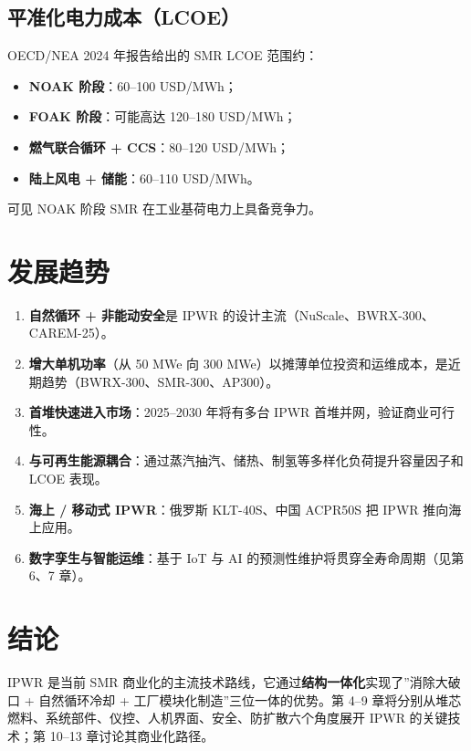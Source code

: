 \documentclass[
  UTF8,
  scheme=plain,
  fontsize=10pt,
  openany
]{ctexbook}
\begin{document}
\subsection{平准化电力成本（LCOE）}\label{ux5e73ux51c6ux5316ux7535ux529bux6210ux672clcoe}

OECD/NEA 2024 年报告给出的 SMR LCOE 范围约：

\begin{itemize}
\tightlist
\item
  \textbf{NOAK 阶段}：60--100 USD/MWh；
\item
  \textbf{FOAK 阶段}：可能高达 120--180 USD/MWh；
\item
  \textbf{燃气联合循环 + CCS}：80--120 USD/MWh；
\item
  \textbf{陆上风电 + 储能}：60--110 USD/MWh。
\end{itemize}

可见 NOAK 阶段 SMR 在工业基荷电力上具备竞争力。

\section{发展趋势}\label{ux53d1ux5c55ux8d8bux52bf-1}

\begin{enumerate}
\def\labelenumi{\arabic{enumi}.}
\tightlist
\item
  \textbf{自然循环 + 非能动安全}是 IPWR
  的设计主流（NuScale、BWRX-300、CAREM-25）。
\item
  \textbf{增大单机功率}（从 50 MWe 向 300
  MWe）以摊薄单位投资和运维成本，是近期趋势（BWRX-300、SMR-300、AP300）。
\item
  \textbf{首堆快速进入市场}：2025--2030 年将有多台 IPWR
  首堆并网，验证商业可行性。
\item
  \textbf{与可再生能源耦合}：通过蒸汽抽汽、储热、制氢等多样化负荷提升容量因子和
  LCOE 表现。
\item
  \textbf{海上 / 移动式 IPWR}：俄罗斯 KLT-40S、中国 ACPR50S 把 IPWR
  推向海上应用。
\item
  \textbf{数字孪生与智能运维}：基于 IoT 与 AI
  的预测性维护将贯穿全寿命周期（见第 6、7 章）。
\end{enumerate}

\section{结论}\label{ux7ed3ux8bba-1}

IPWR 是当前 SMR
商业化的主流技术路线，它通过\textbf{结构一体化}实现了''消除大破口 +
自然循环冷却 + 工厂模块化制造''三位一体的优势。第 4--9
章将分别从堆芯燃料、系统部件、仪控、人机界面、安全、防扩散六个角度展开
IPWR 的关键技术；第 10--13 章讨论其商业化路径。
\end{document}
